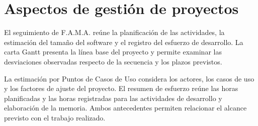 \chapter{Aspectos de gestión de proyectos}
\label{ap:gestion-proyecto}

El seguimiento de F.A.M.A. reúne la planificación de las actividades, la
estimación del tamaño del software y el registro del esfuerzo de desarrollo.
La carta Gantt presenta la línea base del proyecto y permite examinar las
desviaciones observadas respecto de la secuencia y los plazos previstos.

La estimación por Puntos de Casos de Uso considera los actores, los casos de
uso y los factores de ajuste del proyecto. El resumen de esfuerzo reúne las
horas planificadas y las horas registradas para las actividades de desarrollo
y elaboración de la memoria. Ambos antecedentes permiten relacionar el
alcance previsto con el trabajo realizado.




